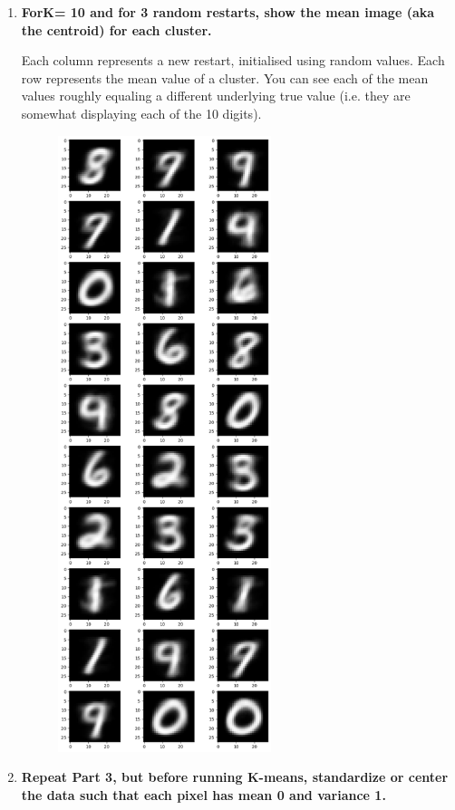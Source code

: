 \documentclass[submit]{harvardml}
\begin{document}
\begin{enumerate}
    \newpage
    \item \textbf{ ForK= 10 and for 3 random restarts, show the mean image (aka the centroid) for each cluster.}
    
    Each column represents a new restart, initialised using random values. Each row represents the mean value of a cluster. You can see each of the mean values roughly equaling a different underlying true value (i.e. they are somewhat displaying each of the 10 digits).
    
    \begin{figure}[H]
        \includegraphics[height=18cm]{hw4/img/p2_3.png}
        \centering
    \end{figure}
    
    \newpage
    \item \textbf{Repeat Part 3, but before running K-means, standardize or center the data such that each pixel has mean 0 and variance 1.}
    

\end{enumerate}
\end{document}
